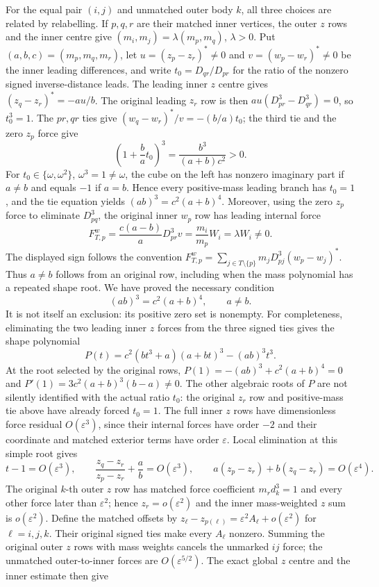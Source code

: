 \documentclass[11pt]{amsart}
\theoremstyle{remark}
\begin{document}
For the equal pair $(i,j)$ and unmatched outer body $k$, all three choices are related by relabelling. If $p,q,r$ are their matched inner vertices, the outer $z$ rows and the inner centre give $(m_i,m_j)=\lambda(m_p,m_q)$, $\lambda>0$. Put $(a,b,c)=(m_p,m_q,m_r)$, let $u=(z_p-z_r)^*\ne0$ and $v=(w_p-w_r)^*\ne0$ be the inner leading differences, and write $t_0=D_{qr}/D_{pr}$ for the ratio of the nonzero signed inverse-distance leads. The leading inner $z$ centre gives $(z_q-z_r)^*=-au/b$. The original leading $z_r$ row is then $au(D_{pr}^3-D_{qr}^3)=0$, so $t_0^3=1$. The $pr,qr$ ties give $(w_q-w_r)^*/v=-(b/a)t_0$; the third tie and the zero $z_p$ force give
\[
 \left(1+\frac ba t_0\right)^3=\frac{b^3}{(a+b)c^2}>0.
\]
For $t_0\in\{\omega,\omega^2\}$, $\omega^3=1\ne\omega$, the cube on the left has nonzero imaginary part if $a\ne b$ and equals $-1$ if $a=b$. Hence every positive-mass leading branch has $t_0=1$, and the tie equation yields $(ab)^3=c^2(a+b)^4$. Moreover, using the zero $z_p$ force to eliminate $D_{pq}^3$, the original inner $w_p$ row has leading internal force
\[
 F^w_{T,p}=\frac{c(a-b)}{a}D_{pr}^3v
       =\frac{m_i}{m_p}W_i=\lambda W_i\ne0.
\]
The displayed sign follows the convention $F^w_{T,p}=\sum_{j\in T\setminus\{p\}}m_jD_{pj}^3(w_p-w_j)^*$. Thus $a\ne b$ follows from an original row, including when the mass polynomial has a repeated shape root. We have proved the necessary condition
\begin{equation}\label{eq:no20-mass-condition}
(ab)^3=c^2(a+b)^4,\qquad a\ne b.
\end{equation}
It is not itself an exclusion: its positive zero set is nonempty. For completeness, eliminating the two leading inner $z$ forces from the three signed ties gives the shape polynomial
\[
 P(t)=c^2(bt^3+a)(a+bt)^3-(ab)^3t^3.
\]
At the root selected by the original rows, $P(1)=-(ab)^3+c^2(a+b)^4=0$ and $P'(1)=3c^2(a+b)^3(b-a)\ne0$. The other algebraic roots of $P$ are not silently identified with the actual ratio $t_0$: the original $z_r$ row and positive-mass tie above have already forced $t_0=1$. The full inner $z$ rows have dimensionless force residual $O(\varepsilon^3)$, since their internal forces have order $-2$ and their coordinate and matched exterior terms have order $\varepsilon$. Local elimination at this simple root gives
\[
 t-1=O(\varepsilon^3),\qquad
 \frac{z_q-z_r}{z_p-z_r}+\frac ab=O(\varepsilon^3),\qquad
 a(z_p-z_r)+b(z_q-z_r)=O(\varepsilon^4).
\]
The original $k$-th outer $z$ row has matched force coefficient $m_rd_k^3=1$ and every other force later than $\varepsilon^2$; hence $z_r=o(\varepsilon^2)$ and the inner mass-weighted $z$ sum is $o(\varepsilon^2)$. Define the matched offsets by $z_\ell-z_{p(\ell)}=\varepsilon^2 A_\ell+o(\varepsilon^2)$ for $\ell=i,j,k$. Their original signed ties make every $A_\ell$ nonzero. Summing the original outer $z$ rows with mass weights cancels the unmarked $ij$ force; the unmatched outer-to-inner forces are $O(\varepsilon^{5/2})$. The exact global $z$ centre and the inner estimate then give
\end{document}
